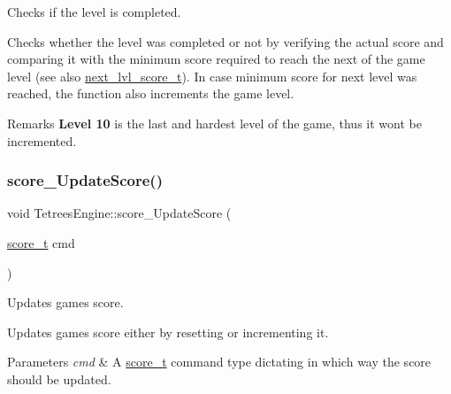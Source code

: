 Checks if the level is completed. 

Checks whether the level was completed or not by verifying the actual score and comparing it with the minimum score required to reach the next of the game level (see also \hyperlink{TetreesDefs_8hpp_adb9f7ea75cb8fca17c40bc2afbe399ca}{next\+\_\+lvl\+\_\+score\+\_\+t}). In case minimum score for next level was reached, the function also increments the game level. \begin{DoxyRemark}{Remarks}
{\bfseries Level 10} is the last and hardest level of the game, thus it won\textquotesingle{}t be incremented. 
\end{DoxyRemark}
\mbox{\label{classTetreesEngine_a856a9de6a79138a19b638d9287d7bc72}} 
\subsubsection{\texorpdfstring{score\+\_\+\+Update\+Score()}{score\_UpdateScore()}}
{\footnotesize\ttfamily void Tetrees\+Engine\+::score\+\_\+\+Update\+Score (\begin{DoxyParamCaption}\item[{\hyperlink{TetreesDefs_8hpp_a5a3b4d94c69ae85b911a8dca1afedfe0}{score\+\_\+t}}]{cmd }\end{DoxyParamCaption})\hspace{0.3cm}{\ttfamily [private]}}



Updates game\textquotesingle{}s score. 

Updates game\textquotesingle{}s score either by resetting or incrementing it. 
\begin{DoxyParams}{Parameters}
{\em cmd} & A \hyperlink{TetreesDefs_8hpp_a5a3b4d94c69ae85b911a8dca1afedfe0}{score\+\_\+t} command type dictating in which way the score should be updated. \\
\hline
\end{DoxyParams}
\mbox{\label{classTetreesEngine_a0978ef1f287f00a8ed5a4af2d680b943}} 
